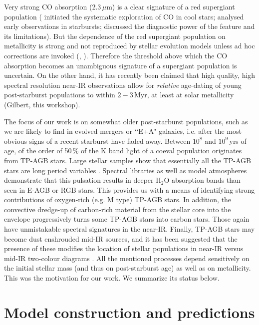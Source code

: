 \documentclass[runningheads]{svmult}
\begin{document}
Very strong CO absorption (2.3\,$\mu$m) is a clear signature of a red 
supergiant population (\cite{BFP73} initiated the systematic
exploration of CO in cool stars; \cite{Retal80} analysed early
observations in starbursts; \cite{LRV96} discussed the 
diagnostic power of the feature and its limitations). But the dependence
of the red supergiant population on metallicity is strong
\cite{Massey98} and not reproduced by stellar evolution models unless
ad hoc corrections are invoked (\cite{LM95}, \cite{OGLSO99}). 
Therefore the threshold above which the CO absorption becomes
an unambiguous signature of a supergiant population
is uncertain. On the other hand, it has recently been claimed
that high quality, high spectral resolution near-IR observations allow 
for {\em relative} age-dating of young post-starburst populations to within 
$2-3$\,Myr, at least at solar metallicity (Gilbert, this workshop).

The focus of our work is on somewhat older post-starburst populations,
such as we are likely to find in evolved mergers or \lq \lq E+A"
galaxies, i.e. after the most obvious signs of a recent starburst have
faded away.
Between $10^8$ and $10^9$\,yrs of age, of the order of 50\,\% of the K band
light of a coeval population originates from TP-AGB stars.
Large stellar samples show that essentially all the TP-AGB stars are 
long period variables \cite{Wood99}. Spectral libraries as well as
model atmospheres demonstrate that this pulsation results in deeper
H$_2$O absorption bands than seen in E-AGB or RGB stars. This provides
us with a means of identifying strong contributions of oxygen-rich (e.g.
M type) TP-AGB stars. In addition, the convective dredge-up of carbon-rich
material from the stellar core into the envelope progressively turns some
TP-AGB stars into carbon stars. Those again have unmistakable spectral
signatures in the near-IR. Finally, TP-AGB stars may become dust
enshrouded mid-IR sources, and it has been suggested that the presence
of these modifies the location of stellar populations in near-IR
versus mid-IR two-colour diagrams \cite{BGS98}.
All the mentioned processes depend sensitively on the initial stellar
mass (and thus on post-starburst age) as well as on metallicity. This was the 
motivation for our work. We summarize its status below.

\section{Model construction and predictions}
\end{document}
